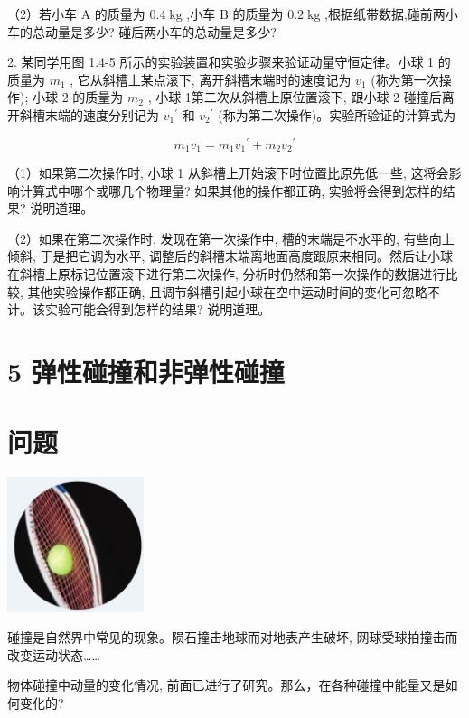 \documentclass[10pt]{article}
\begin{document}
（2）若小车 \(\mathrm{A}\) 的质量为 \({0.4}\mathrm{\;{kg}}\) ,小车 \(\mathrm{B}\) 的质量为 \({0.2}\mathrm{\;{kg}}\) ,根据纸带数据,碰前两小车的总动量是多少? 碰后两小车的总动量是多少?

2. 某同学用图 1.4-5 所示的实验装置和实验步骤来验证动量守恒定律。小球 1 的质量为 \({m}_{1}\) , 它从斜槽上某点滚下, 离开斜槽末端时的速度记为 \({v}_{1}\) (称为第一次操作); 小球 2 的质量为 \({m}_{2}\) , 小球 1第二次从斜槽上原位置滚下, 跟小球 2 碰撞后离开斜槽末端的速度分别记为 \({v}_{1}{}^{\prime }\) 和 \({v}_{2}{}^{\prime }\) (称为第二次操作)。实验所验证的计算式为

\[
{m}_{1}{v}_{1} = {m}_{1}{v}_{1}{}^{\prime } + {m}_{2}{v}_{2}{}^{\prime }
\]

（1）如果第二次操作时, 小球 1 从斜槽上开始滚下时位置比原先低一些, 这将会影响计算式中哪个或哪几个物理量? 如果其他的操作都正确, 实验将会得到怎样的结果? 说明道理。

（2）如果在第二次操作时, 发现在第一次操作中, 槽的末端是不水平的, 有些向上倾斜, 于是把它调为水平, 调整后的斜槽末端离地面高度跟原来相同。然后让小球在斜槽上原标记位置滚下进行第二次操作, 分析时仍然和第一次操作的数据进行比较, 其他实验操作都正确, 且调节斜槽引起小球在空中运动时间的变化可忽略不计。该实验可能会得到怎样的结果? 说明道理。

\section*{5 弹性碰撞和非弹性碰撞}

\section*{问题}

\begin{center}
\includegraphics[max width=0.3\textwidth]{images/01910e4c-ebb8-7d2c-8f2f-2375bc1d2d12_26_351883.jpg}
\end{center}

碰撞是自然界中常见的现象。陨石撞击地球而对地表产生破坏, 网球受球拍撞击而改变运动状态……

物体碰撞中动量的变化情况, 前面已进行了研究。那么，在各种碰撞中能量又是如何变化的?
\end{document}
